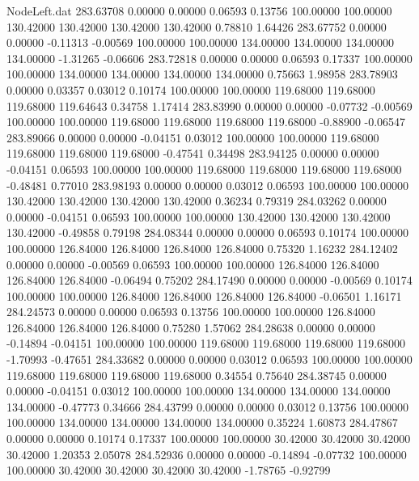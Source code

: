 \begin{filecontents}{NodeLeft.dat}
 283.63708    0.00000    0.00000     0.06593    0.13756  100.00000  100.00000  130.42000  130.42000  130.42000  130.42000    0.78810    1.64426
 283.67752    0.00000    0.00000    -0.11313   -0.00569  100.00000  100.00000  134.00000  134.00000  134.00000  134.00000   -1.31265   -0.06606
 283.72818    0.00000    0.00000     0.06593    0.17337  100.00000  100.00000  134.00000  134.00000  134.00000  134.00000    0.75663    1.98958
 283.78903    0.00000    0.03357     0.03012    0.10174  100.00000  100.00000  119.68000  119.68000  119.68000  119.64643    0.34758    1.17414
 283.83990    0.00000    0.00000    -0.07732   -0.00569  100.00000  100.00000  119.68000  119.68000  119.68000  119.68000   -0.88900   -0.06547
 283.89066    0.00000    0.00000    -0.04151    0.03012  100.00000  100.00000  119.68000  119.68000  119.68000  119.68000   -0.47541    0.34498
 283.94125    0.00000    0.00000    -0.04151    0.06593  100.00000  100.00000  119.68000  119.68000  119.68000  119.68000   -0.48481    0.77010
 283.98193    0.00000    0.00000     0.03012    0.06593  100.00000  100.00000  130.42000  130.42000  130.42000  130.42000    0.36234    0.79319
 284.03262    0.00000    0.00000    -0.04151    0.06593  100.00000  100.00000  130.42000  130.42000  130.42000  130.42000   -0.49858    0.79198
 284.08344    0.00000    0.00000     0.06593    0.10174  100.00000  100.00000  126.84000  126.84000  126.84000  126.84000    0.75320    1.16232
 284.12402    0.00000    0.00000    -0.00569    0.06593  100.00000  100.00000  126.84000  126.84000  126.84000  126.84000   -0.06494    0.75202
 284.17490    0.00000    0.00000    -0.00569    0.10174  100.00000  100.00000  126.84000  126.84000  126.84000  126.84000   -0.06501    1.16171
 284.24573    0.00000    0.00000     0.06593    0.13756  100.00000  100.00000  126.84000  126.84000  126.84000  126.84000    0.75280    1.57062
 284.28638    0.00000    0.00000    -0.14894   -0.04151  100.00000  100.00000  119.68000  119.68000  119.68000  119.68000   -1.70993   -0.47651
 284.33682    0.00000    0.00000     0.03012    0.06593  100.00000  100.00000  119.68000  119.68000  119.68000  119.68000    0.34554    0.75640
 284.38745    0.00000    0.00000    -0.04151    0.03012  100.00000  100.00000  134.00000  134.00000  134.00000  134.00000   -0.47773    0.34666
 284.43799    0.00000    0.00000     0.03012    0.13756  100.00000  100.00000  134.00000  134.00000  134.00000  134.00000    0.35224    1.60873
 284.47867    0.00000    0.00000     0.10174    0.17337  100.00000  100.00000   30.42000   30.42000   30.42000   30.42000    1.20353    2.05078
 284.52936    0.00000    0.00000    -0.14894   -0.07732  100.00000  100.00000   30.42000   30.42000   30.42000   30.42000   -1.78765   -0.92799

\end{filecontents}
